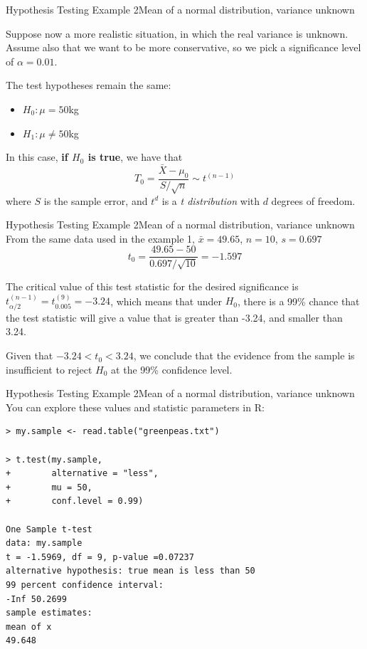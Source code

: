 \begin{frame}{Hypothesis Testing Example 2}{Mean of a normal distribution, variance unknown}

Suppose now a more realistic situation, in which the real variance is unknown. Assume also that we want to be more conservative, so we pick a significance level of $\alpha = 0.01$. \medskip

The test hypotheses remain the same:
\begin{itemize}
  \item $H_0: \mu = 50$kg
  \item $H_1: \mu \neq 50$kg
\end{itemize}\bigskip

In this case, {\bf if $H_0$ is true}, we have that
\begin{equation*}
  T_0 = \frac{\bar{X}-\mu_0}{S/\sqrt{n}} \sim t^{(n-1)}
\end{equation*}
where $S$ is the sample error, and $t^d$ is a \emph{t distribution} with $d$ degrees of freedom.
\end{frame}

\begin{frame}{Hypothesis Testing Example 2}{Mean of a normal distribution, variance unknown}
  From the same data used in the example 1, $\bar{x} = 49.65$, $n=10$, $s = 0.697$
  \begin{equation*}
    t_0 = \frac{49.65-50}{0.697/\sqrt{10}} = -1.597
  \end{equation*}
  \bigskip

  The critical value of this test statistic for the desired significance is $t^{(n-1)}_{\alpha/2} = t^{(9)}_{0.005} = -3.24$, which means that under $H_0$, there is a 99\% chance that the test statistic will give a value that is greater than -3.24, and smaller than 3.24.\bigskip

  Given that $-3.24 < t_0 < 3.24$, we conclude that the evidence from the sample is insufficient to reject $H_0$ at the 99\% confidence level.
\end{frame}

\begin{frame}[fragile]{Hypothesis Testing Example 2}{Mean of a normal distribution, variance unknown}
  You can explore these values and statistic parameters in R:
  \bigskip

{\smaller
\begin{verbatim}
> my.sample <- read.table("greenpeas.txt")

> t.test(my.sample,
+        alternative = "less",
+        mu = 50,
+        conf.level = 0.99)

One Sample t-test
data: my.sample
t = -1.5969, df = 9, p-value =0.07237
alternative hypothesis: true mean is less than 50
99 percent confidence interval:
-Inf 50.2699
sample estimates:
mean of x
49.648
\end{verbatim}}
\end{frame}

